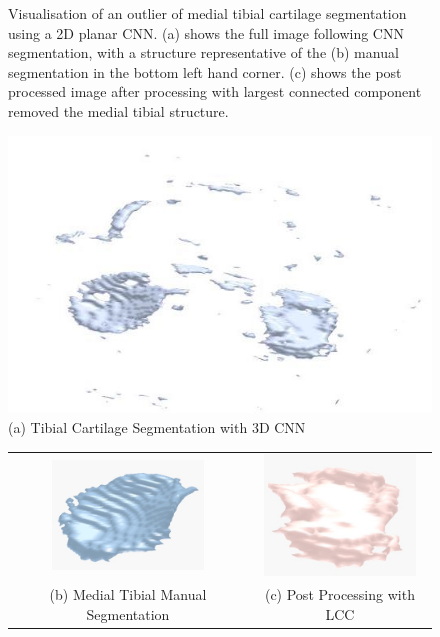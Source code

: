 \documentclass[11pt,a4paper]{memoir}
\numberwithin{figure}{section}
\numberwithin{table}{section}
\numberwithin{equation}{section}
\begin{document}
\begin{figure}[!h]
\begin{adjustwidth}{-1.5cm}{}
\begin{tabular}{cc}
\end{tabular}
\end{adjustwidth}
\caption[Visualisation of medial tibial cartilage segmentation error Using a 2D planar CNN architecture]{Visualisation of an outlier of medial tibial cartilage segmentation using a 2D planar CNN. (a) shows the full image following CNN segmentation, with a structure representative of the (b) manual segmentation in the bottom left hand corner. (c) shows the post processed image after processing with largest connected component removed the medial tibial structure. }
\label{plane-bad}
\end{figure}

\begin{figure}[!h]
 \includegraphics[width=130mm]{3d_seg_worst.jpg}\\
 \centering
  (a) Tibial Cartilage Segmentation with 3D CNN\\
 \begin{tabular}{cc}
  \includegraphics[width=40mm]{3dlab.jpeg} &   \includegraphics[width=40mm]{3derror.jpeg} \\
(b) Medial Tibial Manual Segmentation & (c) Post Processing with LCC\\


\end{tabular}
\end{figure}
\end{document}
